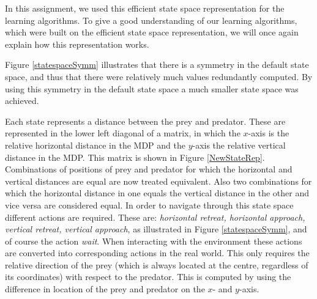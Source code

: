 \documentclass{article}
\begin{document}
In this assignment, we used this efficient state space representation for the learning algorithms. To give a good understanding of our learning algorithms, which were built on the efficient state space representation, we will once again explain how this representation works.

Figure \ref{statespaceSymm} illustrates that there is a symmetry in the default state space, and thus that there were relatively much values redundantly computed.
By using this symmetry in the default state space a much smaller state space was achieved. 

Each state represents a distance between the prey and predator. These are represented in the lower left diagonal of a matrix, in which the $x$-axis is the relative horizontal distance in the MDP and the $y$-axis the relative vertical distance in the MDP. This matrix is shown in Figure \ref{NewStateRep}. Combinations of positions of prey and predator for which the horizontal and vertical distances are equal are now treated equivalent. 
Also two combinations for which the horizontal distance in one equals the vertical distance in the other and vice versa are considered equal. In order to navigate through this state space different actions are required. These are: \textit{horizontal retreat, horizontal approach, vertical retreat, vertical approach}, as illustrated in Figure \ref{statespaceSymm}, and of course the action \textit{wait}. When interacting with the environment these actions are converted into corresponding actions in the real world. This only requires the relative direction of the prey (which is always located at the centre, regardless of its coordinates) with respect to the predator. This is computed by using the difference in location of the prey and predator on the $x$- and $y$-axis.
\end{document}
